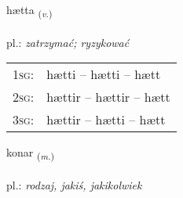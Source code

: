 \documentclass[frontgrid, backgrid]{flacards}\usepackage[]{graphicx}\usepackage[]{xcolor}
\begin{document}
\renewcommand{\blhead}{\vskip5pt {\small\bfseries\footnotesize Sagnorð | Verb }}
\renewcommand{\bcfoot}{\vskip5pt \hspace{2pt}{\small\bfseries\footnotesize 1K}}


{hætta \small{\textsubscript{(\textit{v.})}} \\[1ex] %
\textphonetic{[haihta]} \\
pl.: \emph{zatrzymać; ryzykować} \\  [2ex]
\renewcommand*{\arraystretch}{0.8}
\begin{tabular}{p{1cm}l}
\textsc{1sg}: & hætti -- hætti -- hætt \\ 
\textsc{2sg}: & hættir -- hættir -- hætt \\ 
\textsc{3sg}: & hættir -- hætti -- hætt \\ 
\end{tabular}
}

\renewcommand{\flhead}{\vskip5pt \fboxsep=0pt {\small\bfseries\footnotesize Nafnorð | Noun}}
\renewcommand{\fcfoot}{\vskip5pt \fboxsep=0pt \hspace{2pt}{\small\bfseries\footnotesize 1K}}

\renewcommand{\blhead}{\vskip5pt {\small\bfseries\footnotesize Nafnorð | Noun }}
\renewcommand{\bcfoot}{\vskip5pt \hspace{2pt}{\small\bfseries\footnotesize 1K}}


{konar \small{\textsubscript{(\textit{m.})}} \\[1ex] %
\textphonetic{[kʰɔːnar]} \\
pl.: \emph{rodzaj, jakiś, jakikolwiek} \\  [2ex]
\renewcommand*{\arraystretch}{0.8}
}

\renewcommand{\flhead}{\vskip5pt \fboxsep=0pt {\small\bfseries\footnotesize Nafnorð | Noun}}
\renewcommand{\fcfoot}{\vskip5pt \fboxsep=0pt \hspace{2pt}{\small\bfseries\footnotesize 1K}}
\end{document}
